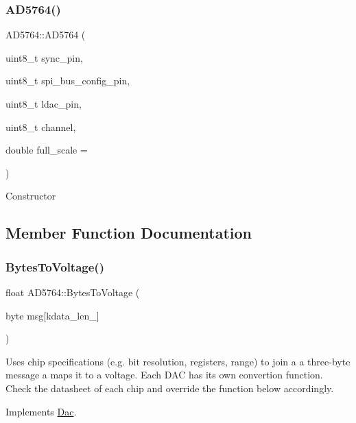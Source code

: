 \subsubsection{\texorpdfstring{A\+D5764()}{AD5764()}}
{\footnotesize\ttfamily A\+D5764\+::\+A\+D5764 (\begin{DoxyParamCaption}\item[{uint8\+\_\+t}]{sync\+\_\+pin,  }\item[{uint8\+\_\+t}]{spi\+\_\+bus\+\_\+config\+\_\+pin,  }\item[{uint8\+\_\+t}]{ldac\+\_\+pin,  }\item[{uint8\+\_\+t}]{channel,  }\item[{double}]{full\+\_\+scale = {} }\end{DoxyParamCaption})}

Constructor 

\subsection{Member Function Documentation}
\mbox{\label{classAD5764_a8f2845c7dd6b8984e7b85c35e50bbb66}} 
\subsubsection{\texorpdfstring{Bytes\+To\+Voltage()}{BytesToVoltage()}}
{\footnotesize\ttfamily float A\+D5764\+::\+Bytes\+To\+Voltage (\begin{DoxyParamCaption}\item[{byte}]{msg\mbox{[}kdata\+\_\+len\+\_\+\mbox{]} }\end{DoxyParamCaption})\hspace{0.3cm}{\ttfamily [virtual]}}

Uses chip specifications (e.\+g. bit resolution, registers, range) to join a a three-\/byte message a maps it to a voltage. Each D\+AC has its own convertion function. Check the datasheet of each chip and override the function below accordingly. 

Implements \mbox{\hyperlink{classDac_a1dc9be97cb41ddacbd8dde0c5d4243b4}{Dac}}.

\mbox{\label{classAD5764_aae10d34276fdfcb3542e39bccd2f20f6}} 
